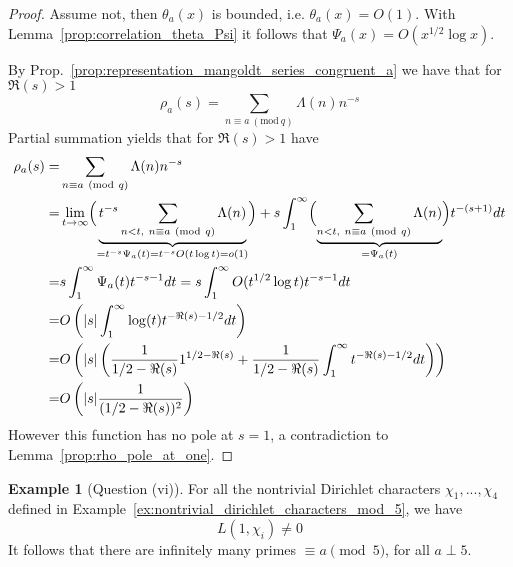 \documentclass{scrartcl}
\theoremstyle{definition}
\newtheorem{example}[definition]{Example}
\begin{document}
\begin{proof}
    Assume not, then $\theta_a(x)$ is bounded, i.e. $\theta_a(x) = O(1)$.
    With Lemma~\ref{prop:correlation_theta_Psi} it follows that $\Psi_a(x) = O(x^{1/2} \log x)$.

    By Prop.~\ref{prop:representation_mangoldt_series_congruent_a} we have that for $\Re(s) > 1$
    \begin{equation*}
        \rho_a(s) = \sum_{n \equiv a \ (\text{mod} \ q)} \Lambda(n) n^{-s}
    \end{equation*}
    Partial summation yields that for $\Re(s) > 1$ have
    \begin{align*}
        \rho_a(s) =& \sum_{n \equiv a \ (\text{mod} \ q)} \Lambda(n) n^{-s} \\
        =& \lim_{t \to \infty} \Bigl( \underbrace{ t^{-s} \sum_{n < t, \ n \equiv a \ (\text{mod} \ q)} \Lambda(n) }_{ = t^{-s} \Psi_a(t) = t^{-s} O(t\log t) = o(1)} \Bigr) 
        + s \int_1^\infty \Bigl( \underbrace{\sum_{n < t, \ n \equiv a \ (\text{mod} \ q)} \Lambda(n) }_{ = \Psi_a(t)} \Bigr) t^{-(s + 1)} dt \\
        =& s \int_1^\infty \Psi_a(t) t^{-s - 1} dt = s \int_1^\infty O(t^{1/2}\log t) t^{-s - 1} dt \\
        =& O\left( |s| \int_1^\infty \log(t) t^{-\Re(s) - 1/2} dt \right) \\
        =& O\left( |s| \left( \frac 1 {1/2 - \Re(s)} 1^{1/2 - \Re(s)} + \frac 1 {1/2 - \Re(s)} \int_1^\infty t^{-\Re(s) - 1/2} dt \right) \right) \\
        =& O\left( |s| \frac 1 {(1/2 - \Re(s))^2} \right)
    \end{align*}
    However this function has no pole at $s = 1$, a contradiction to Lemma~\ref{prop:rho_pole_at_one}.
\end{proof}
\begin{example}[Question (vi)]
    For all the nontrivial Dirichlet characters $\chi_1, ..., \chi_4$ defined in Example~\ref{ex:nontrivial_dirichlet_characters_mod_5}, we have
    \begin{equation*}
        L(1, \chi_i) \neq 0
    \end{equation*}
    It follows that there are infinitely many primes $\equiv a \pmod 5$, for all $a \perp 5$.
\end{example}
\end{document}
